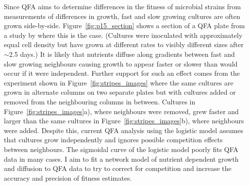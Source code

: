 Since QFA aims to determine differences in the fitness of microbial
strains from measurements of differences in growth, fast and slow
growing cultures are often grown
side-by-side. Figure~\ref{fig:p15_section} shows a section of a QFA
plate from a study by \citeauthor*{Addinall2011} where this is the
case. (Cultures were inoculated with approximately equal cell density
but have grown at different rates to visibly different sizes after
\(\sim\)2.5 days.) It is likely that nutrients diffuse along gradients
between fast and slow growing neighbours causing growth to appear
faster or slower than would occur if it were independent. Further
support for such an effect comes from the experiment shown in
Figure~\ref{fig:stripes_images} where the same cultures are grown in
alternate columns on two separate plates but with cultures added or
removed from the neighbouring columns in between. Cultures in
Figure~\ref{fig:stripes_images}a), where neighbours were removed, grew
faster and larger than the same cultures in
Figure~\ref{fig:stripes_images}b), where neighbours were
added. Despite this, current QFA analysis using the logistic model
assumes that cultures grow independently and ignores possible
competition effects between neighbours. The sigmoidal curve of the
logistic model poorly fits QFA data in many cases. I aim to fit a
network model of nutrient dependent growth and diffusion to QFA data
to try to correct for competition and increase the accuracy and
precision of fitness estimates.

